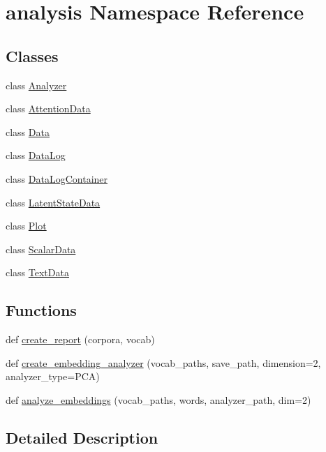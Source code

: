 \hypertarget{namespaceanalysis}{}\section{analysis Namespace Reference}
\label{namespaceanalysis}
\subsection*{Classes}
\begin{DoxyCompactItemize}
\item 
class \hyperlink{classanalysis_1_1Analyzer}{Analyzer}
\item 
class \hyperlink{classanalysis_1_1AttentionData}{Attention\+Data}
\item 
class \hyperlink{classanalysis_1_1Data}{Data}
\item 
class \hyperlink{classanalysis_1_1DataLog}{Data\+Log}
\item 
class \hyperlink{classanalysis_1_1DataLogContainer}{Data\+Log\+Container}
\item 
class \hyperlink{classanalysis_1_1LatentStateData}{Latent\+State\+Data}
\item 
class \hyperlink{classanalysis_1_1Plot}{Plot}
\item 
class \hyperlink{classanalysis_1_1ScalarData}{Scalar\+Data}
\item 
class \hyperlink{classanalysis_1_1TextData}{Text\+Data}
\end{DoxyCompactItemize}
\subsection*{Functions}
\begin{DoxyCompactItemize}
\item 
def \hyperlink{namespaceanalysis_a82f8f53691780b2cace1b4e9f501d837}{create\+\_\+report} (corpora, vocab)
\item 
def \hyperlink{namespaceanalysis_a5ebd1b1612476f1fa69eeb78f483b929}{create\+\_\+embedding\+\_\+analyzer} (vocab\+\_\+paths, save\+\_\+path, dimension=2, analyzer\+\_\+type=\textquotesingle{}P\+CA\textquotesingle{})
\item 
def \hyperlink{namespaceanalysis_aa24b08d3ae5223bbb4ff08b46d3b6f4b}{analyze\+\_\+embeddings} (vocab\+\_\+paths, words, analyzer\+\_\+path, dim=2)
\end{DoxyCompactItemize}


\subsection{Detailed Description}
\begin{DoxyVerb}\end{DoxyVerb}
 

